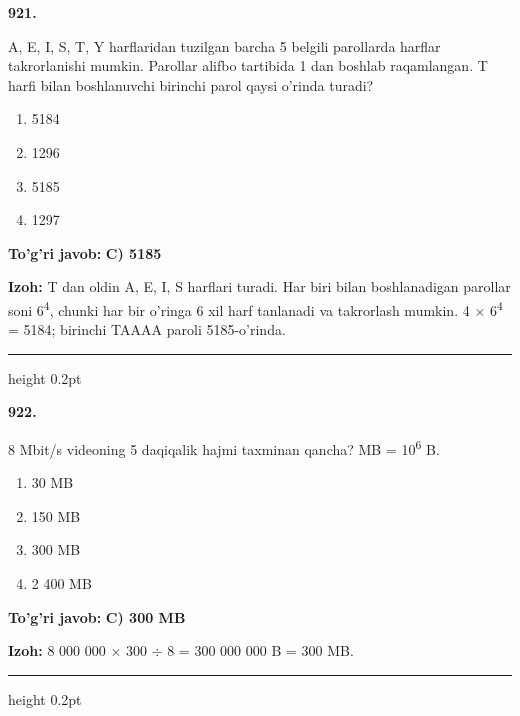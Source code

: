 \documentclass[10pt,a4paper,oneside]{article}
\begin{document}
\noindent\textbf{\color{ink}921.}
\par
A, E, I, S, T, Y harflaridan tuzilgan barcha 5 belgili parollarda harflar takrorlanishi mumkin. Parollar alifbo tartibida 1 dan boshlab raqamlangan. T harfi bilan boshlanuvchi birinchi parol qaysi o'rinda turadi?
\begin{enumerate}[label=\Alph*),leftmargin=9mm]
\item 5184
\item 1296
\item 5185
\item 1297
\end{enumerate}
\begin{tcolorbox}[enhanced,breakable,colback=teal!4,colframe=teal!50!black,boxrule=0.5pt,arc=1.1mm,left=3mm,right=3mm,top=1.7mm,bottom=1.7mm,before skip=2mm,after skip=2mm]
\textbf{\color{teal}To'g'ri javob:} \textbf{C) 5185}
\par\smallskip
\textbf{Izoh:} T dan oldin A, E, I, S harflari turadi. Har biri bilan boshlanadigan parollar soni 6\textsuperscript{4}, chunki har bir o'ringa 6 xil harf tanlanadi va takrorlash mumkin. 4 \ensuremath{\times} 6\textsuperscript{4} = 5184; birinchi TAAAA paroli 5185-o'rinda.
\end{tcolorbox}
\vspace{2mm}\hrule height 0.2pt \vspace{3mm}

\noindent\textbf{\color{ink}922.}
\par
8 Mbit/s videoning 5 daqiqalik hajmi taxminan qancha? MB = 10\textsuperscript{6} B.
\begin{enumerate}[label=\Alph*),leftmargin=9mm]
\item 30 MB
\item 150 MB
\item 300 MB
\item 2 400 MB
\end{enumerate}
\begin{tcolorbox}[enhanced,breakable,colback=teal!4,colframe=teal!50!black,boxrule=0.5pt,arc=1.1mm,left=3mm,right=3mm,top=1.7mm,bottom=1.7mm,before skip=2mm,after skip=2mm]
\textbf{\color{teal}To'g'ri javob:} \textbf{C) 300 MB}
\par\smallskip
\textbf{Izoh:} 8 000 000 \ensuremath{\times} 300 \ensuremath{\div} 8 = 300 000 000 B = 300 MB.
\end{tcolorbox}
\vspace{2mm}\hrule height 0.2pt \vspace{3mm}
\end{document}
